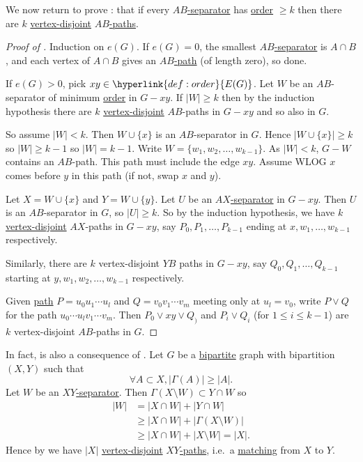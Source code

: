 \documentclass{article}
\begin{document}
We now return to prove : that if every \hyperlink{def:abpath}{$AB$-separator} has \hyperlink{def:order}{order} $\geq k$ then there are $k$ \hyperlink{def:vertexDisjoint}{vertex-disjoint} \hyperlink{def:abpath}{$AB$-paths}.
\begin{proof}[Proof of ]
    Induction on \hyperlink{def:eG}{$e(G)$}.
    If $e(G) = 0$, the smallest \hyperlink{def:abpath}{$AB$-separator} is $A \cap B$, and each vertex of $A \cap B$ gives an \hyperlink{def:abpath}{$AB$-path} (of length zero), so done.

    If $e(G) > 0$, pick $xy \in \hyperlink{def:order}{E(G)}$.
    Let $W$ be an $AB$-separator of minimum \hyperlink{def:order}{order} in $G - xy$.
    If $|W| \geq k$ then by the induction hypothesis there are $k$ \hyperlink{def:vertexDisjoint}{vertex-disjoint} $AB$-paths in $G-xy$ and so also in $G$.

    So assume $|W| < k$. Then $W \cup \{x\}$ is an $AB$-separator in $G$.
    Hence $|W \cup \{x\}| \geq k$ so $|W| \geq k-1$ so $|W| = k-1$.
    Write $W = \{w_1, w_2, \dotsc, w_{k-1}\}$. As $|W| < k$, $G-W$ contains an $AB$-path.
    This path must include the edge $xy$.
    Assume WLOG $x$ comes before $y$ in this path (if not, swap $x$ and $y$).

    Let $X = W \cup \{x\}$ and $Y = W \cup \{y\}$.
    Let $U$ be an \hyperlink{def:abpath}{$AX$-separator} in $G-xy$. Then $U$ is an $AB$-separator in $G$, so $|U| \geq k$.
    So by the induction hypothesis, we have $k$ \hyperlink{def:vertexDisjoint}{vertex-disjoint} $AX$-paths in $G-xy$, say $P_0, P_1, \dotsc, P_{k-1}$ ending at $x, w_1, \dotsc, w_{k-1}$ respectively.

    Similarly, there are $k$ vertex-disjoint $YB$ paths in $G-xy$, say $Q_0, Q_1, \dotsc, Q_{k-1}$ starting at $y, w_1, w_2, \dotsc, w_{k-1}$ respectively.

    Given \hyperlink{def:path}{path} $P=u_0 u_1 \dotsm u_l$ and $Q = v_0 v_1 \dotsm v_m$ meeting only at $u_l = v_0$, write $P \vee Q$ for the path $u_0 \dotsm u_l v_1 \dotsm v_m$.
    Then $P_0 \vee xy \vee Q_)$ and $P_i \vee Q_i$ (for $1 \leq i \leq k-1$) are $k$ vertex-disjoint $AB$-paths in $G$.
\end{proof}
In fact,  is also a consequence of .
Let $G$ be a \hyperlink{def:bipartite}{bipartite} graph with bipartition $(X,Y)$ such that
\begin{equation*}
    \forall A \subset X, |\Gamma(A)| \geq |A|.
\end{equation*}
Let $W$ be an \hyperlink{def:abpath}{$XY$-separator}.
Then $\Gamma(X \setminus W) \subset Y \cap W$ so
\begin{align*}
    |W| &= |X \cap W| + |Y \cap W| \\
        &\geq |X \cap W| + |\Gamma(X \setminus W)| \\
        &\geq |X \cap W| + |X \setminus W| = |X|.
\end{align*}
Hence by  we have $|X|$ \hyperlink{def:vertexDisjoint}{vertex-disjoint} \hyperlink{def:abpath}{$XY$-paths}, i.e.\ a \hyperlink{def:matching}{matching} from $X$ to $Y$.
\end{document}
